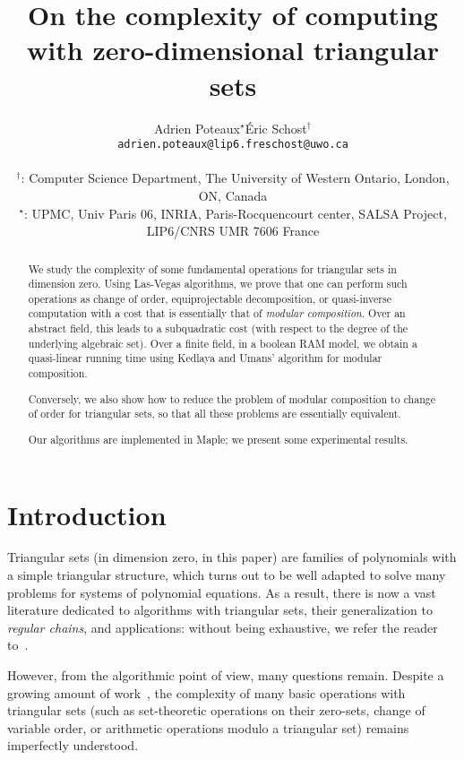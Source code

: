 \documentclass[12pt]{article}
\title{On the complexity of computing with zero-dimensional triangular sets}
\author{
  \begin{tabular}{cc}
    Adrien Poteaux$^{\star}$ & \'Eric Schost$^\dagger$ \\ 
    \texttt{adrien.poteaux@lip6.fr} & \texttt{eschost@uwo.ca}\\
  \end{tabular}\\
  ${}^\dagger$: {\scriptsize Computer Science Department, 
    The University of Western Ontario, London, ON, Canada}\\
  ${}^\star$: {\scriptsize UPMC, Univ Paris 06, INRIA, Paris-Rocquencourt center, SALSA Project, LIP6/CNRS UMR 7606 France}
}
\begin{document}
\maketitle

\begin{abstract}
  We study the complexity of some fundamental operations for
  triangular sets in dimension zero. Using Las-Vegas algorithms, we
  prove that one can perform such operations as change of order,
  equiprojectable decomposition, or quasi-inverse computation with a
    cost that is essentially that of {\em modular composition}. Over
    an abstract field, this leads to a subquadratic cost (with respect
    to the degree of the underlying algebraic set). Over a finite
    field, in a boolean RAM model, we obtain a quasi-linear running
    time using Kedlaya and Umans' algorithm for modular composition.

  Conversely, we also show how to reduce the problem of modular
  composition to change of order for triangular sets, so that all
  these problems are essentially equivalent.

  Our algorithms are implemented in Maple; we present some
  experimental results.
\end{abstract}








\section{Introduction}\label{sec:intro}

Triangular sets (in dimension zero, in this paper) are families of
polynomials with a simple triangular structure, which turns out to be
well adapted to solve many problems for systems of polynomial
equations. As a result, there is now a vast literature dedicated to
algorithms with triangular sets, their generalization to {\em regular
  chains}, and applications: without being exhaustive, we refer the
reader
to~\cite{Kalkbrener93,AuLaMo99,MorenoMaza00,Hubert03,Schost03,Schost03b}.

However, from the algorithmic point of view, many questions
remain. Despite a growing amount of work~\cite{LiMoSc09,
  LiMoPa09,BoChHoSc09}, the complexity of many basic operations with
triangular sets (such as set-theoretic operations on their zero-sets,
change of variable order, or arithmetic operations modulo a triangular
set) remains imperfectly understood.
\end{document}

